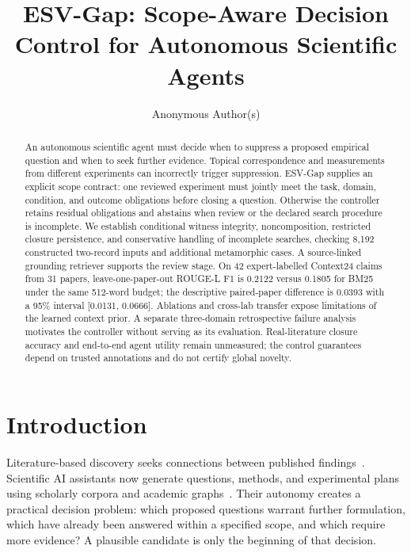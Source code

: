 \documentclass[runningheads]{llncs}
\begin{document}
\title{ESV-Gap: Scope-Aware Decision Control for Autonomous Scientific Agents}
\author{Anonymous Author(s)}
\maketitle

\begin{abstract}
An autonomous scientific agent must decide when to suppress a proposed empirical question and when to seek further evidence. Topical correspondence and measurements from different experiments can incorrectly trigger suppression. ESV-Gap supplies an explicit scope contract: one reviewed experiment must jointly meet the task, domain, condition, and outcome obligations before closing a question. Otherwise the controller retains residual obligations and abstains when review or the declared search procedure is incomplete. We establish conditional witness integrity, noncomposition, restricted closure persistence, and conservative handling of incomplete searches, checking 8,192 constructed two-record inputs and additional metamorphic cases. A source-linked grounding retriever supports the review stage. On 42 expert-labelled Context24 claims from 31 papers, leave-one-paper-out ROUGE-L F1 is 0.2122 versus 0.1805 for BM25 under the same 512-word budget; the descriptive paired-paper difference is 0.0393 with a 95\% interval [0.0131, 0.0666]. Ablations and cross-lab transfer expose limitations of the learned context prior. A separate three-domain retrospective failure analysis motivates the controller without serving as its evaluation. Real-literature closure accuracy and end-to-end agent utility remain unmeasured; the control guarantees depend on trusted annotations and do not certify global novelty.
\end{abstract}

\section{Introduction}
Literature-based discovery seeks connections between published findings~\cite{swanson1986}. Scientific AI assistants now generate questions, methods, and experimental plans using scholarly corpora and academic graphs~\cite{baek2025}. Their autonomy creates a practical decision problem: which proposed questions warrant further formulation, which have already been answered within a specified scope, and which require more evidence? A plausible candidate is only the beginning of that decision.
\end{document}
